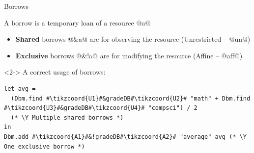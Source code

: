 \documentclass[aspectratio=169,dvipsnames,svgnames,10pt]{beamer}
\newcommand\Y{{\color{Green}{\ding{52}}}}
\begin{document}
\begin{frame}[t,fragile]{Borrows}
  
  A borrow is a temporary loan of a resource @a@
  \begin{itemize}
  \item
    \textbf{Shared} borrows @&a@ are for observing the resource (Unrestricted -- @un@)
  \item
    \textbf{Exclusive} borrows @&!a@ are for modifying the resource (Affine -- @aff@)
  \end{itemize}

  \begin{onlyenv}<2->
  A correct usage of borrows:
\begin{verbatim}
let avg =
  (Dbm.find #\tikzcoord{U1}#&gradeDB#\tikzcoord{U2}# "math" + Dbm.find #\tikzcoord{U3}#&gradeDB#\tikzcoord{U4}# "compsci") / 2
  (* \Y Multiple shared borrows *)
in
Dbm.add #\tikzcoord{A1}#&!gradeDB#\tikzcoord{A2}# "average" avg (* \Y One exclusive borrow *)
\end{verbatim}
  \end{onlyenv}  
\end{frame}
\end{document}
